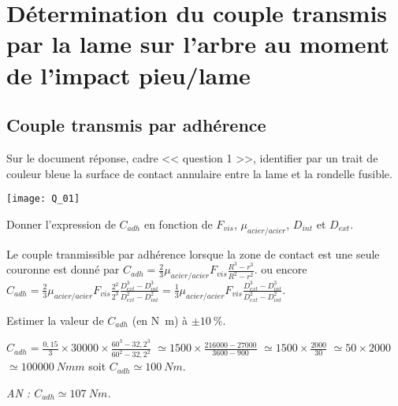 \documentclass[11pt]{article}
\begin{document}
\UPSTIpreambuleEpreuve	%



\section{Détermination du couple transmis par la lame sur l'arbre au moment de l'impact pieu/lame}

\subsection{Couple transmis par adhérence}

\UPSTIquestion* Sur le document réponse, cadre << question 1 >>, identifier par un trait de couleur bleue la surface de contact annulaire entre la lame et la rondelle fusible. 

\begin{UPSTIcorrige}

\begin{center}
\texttt{[image: Q\_01]}
\end{center}

\end{UPSTIcorrige}

\UPSTIquestion Donner l'expression de $C_{{adh}}$ en fonction de $F_{{vis}}$, $\mu_{{acier/acier}}$, $D_{{int}}$ et $D_{{ext}}$.

\begin{UPSTIcorrige}
Le couple tranmissible par adhérence lorsque la zone de contact est une seule couronne est donné par 
$C_{adh}=\frac{2}{3} \mu_{{acier/acier}}F_{{vis}} \frac{R^3-r^3}{R^2 - r^2}$.
 ou encore  $C_{adh}=\frac{2}{3} \mu_{{acier/acier}}F_{{vis}} \frac{2^2}{2^3}\frac{D_{{ext}}^3-D_{{int}}^3}{D_{{ext}}^2 - D_{{int}}^2}=\frac{1}{3} \mu_{{acier/acier}}F_{{vis}} \frac{D_{{ext}}^3-D_{{int}}^3}{D_{{ext}}^2 - D_{{int}}^2}$.
\end{UPSTIcorrige}


\UPSTIquestion Estimer la valeur de $C_{{adh}}$ (en \si{N.m}) à $\pm\SI{10}{\%}$.

\begin{UPSTIcorrige}
$C_{adh}=\frac{0,15}{3} \times 30000 \times \frac{60^3-32,2^3}{60^2 - 32,2^2}$
$\simeq 1500\times \frac{216000-27000}{3600 - 900}$
$\simeq 1500\times \frac{2000}{30}$
$\simeq 50\times 2000$
$\simeq \SI{100 000}{Nmm}$
soit $C_{adh}\simeq \SI{100}{Nm}$.

\textit{AN : $C_{adh}\simeq \SI{107}{Nm}$.}

\end{UPSTIcorrige}
\end{document}
